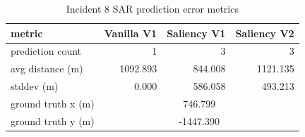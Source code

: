 \begin{table}[ht]
\centering
\caption{Incident 8 SAR prediction error metrics}
\label{tab:sar-incident-8}
\begin{tabular}{lrrr}
\hline
metric & Vanilla V1 & Saliency V1 & Saliency V2 \\
\hline
prediction count & 1 & 3 & 3 \\
avg distance (m) & 1092.893 & 844.008 & 1121.135 \\
stddev (m) & 0.000 & 586.058 & 493.213 \\
ground truth x (m) & \multicolumn{3}{c}{746.799} \\
ground truth y (m) & \multicolumn{3}{c}{-1447.390} \\
\hline
\end{tabular}
\end{table}
